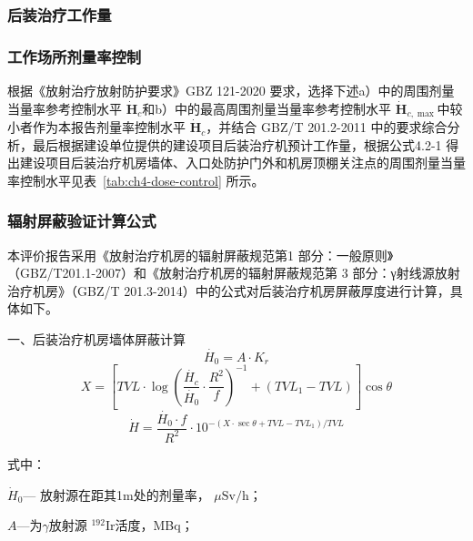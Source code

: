 


\subsubsection{后装治疗工作量}



\subsubsection{工作场所剂量率控制}

根据《放射治疗放射防护要求》GBZ 121-2020 要求，选择下述a）中的周围剂量当量率参考控制水平 $\dot { { \boldsymbol { H } } } _ { c }$和b）中的最高周围剂量当量率参考控制水平 $\dot{\boldsymbol{H} } _ {c,\max}$中较小者作为本报告剂量率控制水平 $\dot { { \boldsymbol { H } } } _ { c }$，并结合 GBZ/T 201.2-2011 中的要求综合分析，最后根据建设单位提供的建设项目后装治疗机预计工作量，根据公式4.2-1 得出建设项目后装治疗机房墙体、入口处防护门外和机房顶棚关注点的周围剂量当量率控制水平见表~\ref{tab:ch4-dose-control} 所示。





\subsubsection{辐射屏蔽验证计算公式}

本评价报告采用《放射治疗机房的辐射屏蔽规范第1 部分：一般原则》（GBZ/T201.1-2007）和《放射治疗机房的辐射屏蔽规范第 3 部分：γ射线源放射治疗机房》（GBZ/T 201.3-2014）中的公式对后装治疗机房屏蔽厚度进行计算，具体如下。

一、后装治疗机房墙体屏蔽计算
\begin{equation}
    \dot{H_0}=A\cdot K_r
\end{equation}
\begin{equation}
    X=\left[TVL\cdot \log\left(\dfrac{\dot{H_c}}{\dot{H_0}}\cdot \dfrac{R^2}{f}\right)^{-1}+(TVL_1-TVL)\right]\cos\theta
\end{equation}
\begin{equation}
    \dot{H}=\dfrac{\dot{H_0}\cdot f}{R^2}\cdot 10^{-(X\cdot \sec\theta+TVL-TVL_1)/TVL}
\end{equation}

式中：

$\dot { H } _ {0}$— 放射源在距其1m处的剂量率， $\mu \mathrm { S v / h }$；

$A$—为$\gamma$放射源 $^ { 1 9 2 } \mathrm { I r }$活度，MBq；

